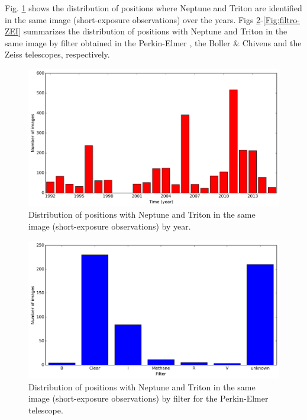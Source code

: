 \documentclass[12pt,a4paper]{report}
\newcommand{\PE}{Perkin-Elmer }
\newcommand{\BC}{Boller \& Chivens }
\begin{document}
Fig. \ref{Fig:pos-dist} shows the distribution of positions where Neptune and Triton are identified in the same image (short-exposure observations) over the years. Figs \ref{Fig:filtro-160}-\ref{Fig:filtro-ZEI} summarizes the distribution of positions with Neptune and Triton in the same image by filter obtained in the \PE , the \BC and the Zeiss telescopes, respectively.

\begin{figure}
\includegraphics[width=16.0cm]{pos-distribution.png} 
\caption{Distribution of positions with Neptune and Triton in the same image (short-exposure observations) by year.}
\label{Fig:pos-dist}
\end{figure}



\begin{figure}[H]
\includegraphics[width=16.0cm]{filtro_160.png} 
\caption{Distribution of positions with Neptune and Triton in the same image (short-exposure observations) by filter for the \PE telescope.}
\label{Fig:filtro-160}
\end{figure}
\end{document}
